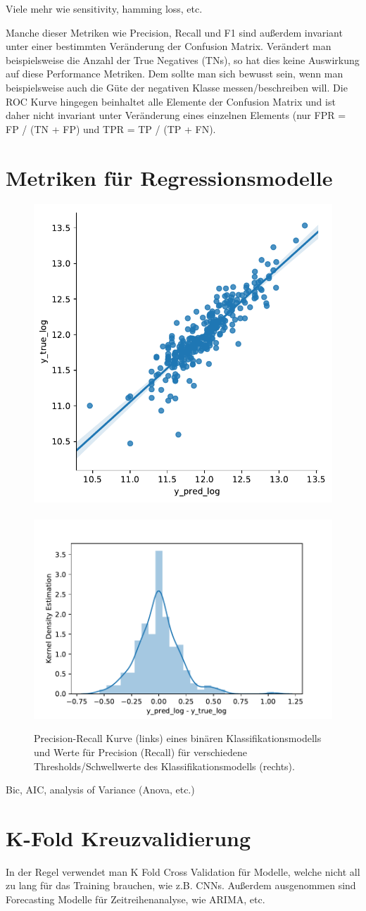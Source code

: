 \documentclass[twoside=true, openright, pdftex, bibliography=totoc, chapterprefix=true, appendixprefix=true, numbers=noenddot, parskip=half, titlepage, index=totoc, headlines=3, footlines=2, headings=normal, language=german]{scrartcl}
\begin{document}
Viele mehr wie sensitivity, hamming loss, etc.

Manche dieser Metriken wie Precision, Recall und F1 sind außerdem invariant unter einer bestimmten Veränderung der Confusion Matrix. Verändert man beispielsweise die Anzahl der True Negatives (TNs), so hat dies keine Auswirkung auf diese Performance Metriken. Dem sollte man sich bewusst sein, wenn man beispielsweise auch die Güte der negativen Klasse messen/beschreiben will. Die ROC Kurve hingegen beinhaltet alle Elemente der Confusion Matrix und ist daher nicht invariant unter Veränderung eines einzelnen Elements (nur FPR = FP / (TN + FP) und TPR = TP / (TP + FN).

\section{Metriken für Regressionsmodelle}
\begin{figure}[t!]
  \centering
        \includegraphics[width=.4\textwidth]{r2.pdf}\
        \includegraphics[width=.45\textwidth]{residuen.pdf}
    \caption{Precision-Recall Kurve (links) eines binären Klassifikationsmodells und Werte für Precision (Recall) für verschiedene Thresholds/Schwellwerte des Klassifikationsmodells (rechts). \label{preRec}}
  \end{figure}

  Bic, AIC, analysis of Variance (Anova, etc.)
\section{K-Fold Kreuzvalidierung}
In der Regel verwendet man K Fold Cross Validation für Modelle, welche nicht all zu lang für das Training brauchen, wie z.B. CNNs. Außerdem ausgenommen sind Forecasting Modelle für Zeitreihenanalyse, wie ARIMA, etc.

 
\end{document}
